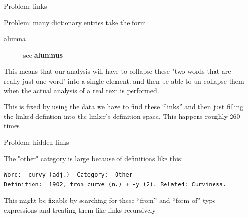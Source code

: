 \documentclass[10pt]{beamer}
\begin{document}
\begin{frame}[fragile]{Problem: links}
  
  Problem: many dictionary entries take the form 

\begin{description}
\item[alumna] see \textbf{alumnus}
\end{description}

This means that our analysis will have to collapse these "two words that are really just one word" into a single element, and then be able to un-collapse them when the actual analysis of a real text is performed. 

\pause

This is fixed by using the data we have to find these ``links'' and then just filling the linked defintion into the linker's definition space. This happens roughly 260 times

\end{frame}

\begin{frame}[fragile]{Problem: hidden links}
  
The "other" category is large because of definitions like this:
\pause
\begin{verbatim}
Word:  curvy (adj.)  Category:  Other
Definition:  1902, from curve (n.) + -y (2). Related: Curviness.

\end{verbatim}
\pause
This might be fixable by searching for these ``from'' and ``form of'' type expressions and treating them like links recursively

\end{frame}












  


\end{document}
